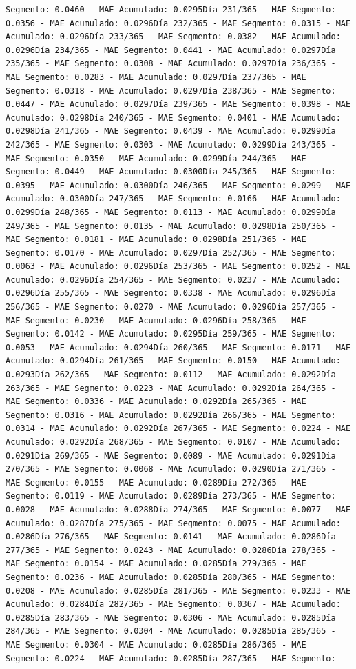 \documentclass[
]{book}
\begin{document}
\begin{verbatim}
Segmento: 0.0460 - MAE Acumulado: 0.0295Día 231/365 - MAE Segmento: 0.0356 - MAE Acumulado: 0.0296Día 232/365 - MAE Segmento: 0.0315 - MAE Acumulado: 0.0296Día 233/365 - MAE Segmento: 0.0382 - MAE Acumulado: 0.0296Día 234/365 - MAE Segmento: 0.0441 - MAE Acumulado: 0.0297Día 235/365 - MAE Segmento: 0.0308 - MAE Acumulado: 0.0297Día 236/365 - MAE Segmento: 0.0283 - MAE Acumulado: 0.0297Día 237/365 - MAE Segmento: 0.0318 - MAE Acumulado: 0.0297Día 238/365 - MAE Segmento: 0.0447 - MAE Acumulado: 0.0297Día 239/365 - MAE Segmento: 0.0398 - MAE Acumulado: 0.0298Día 240/365 - MAE Segmento: 0.0401 - MAE Acumulado: 0.0298Día 241/365 - MAE Segmento: 0.0439 - MAE Acumulado: 0.0299Día 242/365 - MAE Segmento: 0.0303 - MAE Acumulado: 0.0299Día 243/365 - MAE Segmento: 0.0350 - MAE Acumulado: 0.0299Día 244/365 - MAE Segmento: 0.0449 - MAE Acumulado: 0.0300Día 245/365 - MAE Segmento: 0.0395 - MAE Acumulado: 0.0300Día 246/365 - MAE Segmento: 0.0299 - MAE Acumulado: 0.0300Día 247/365 - MAE Segmento: 0.0166 - MAE Acumulado: 0.0299Día 248/365 - MAE Segmento: 0.0113 - MAE Acumulado: 0.0299Día 249/365 - MAE Segmento: 0.0135 - MAE Acumulado: 0.0298Día 250/365 - MAE Segmento: 0.0181 - MAE Acumulado: 0.0298Día 251/365 - MAE Segmento: 0.0170 - MAE Acumulado: 0.0297Día 252/365 - MAE Segmento: 0.0063 - MAE Acumulado: 0.0296Día 253/365 - MAE Segmento: 0.0252 - MAE Acumulado: 0.0296Día 254/365 - MAE Segmento: 0.0237 - MAE Acumulado: 0.0296Día 255/365 - MAE Segmento: 0.0338 - MAE Acumulado: 0.0296Día 256/365 - MAE Segmento: 0.0270 - MAE Acumulado: 0.0296Día 257/365 - MAE Segmento: 0.0230 - MAE Acumulado: 0.0296Día 258/365 - MAE Segmento: 0.0142 - MAE Acumulado: 0.0295Día 259/365 - MAE Segmento: 0.0053 - MAE Acumulado: 0.0294Día 260/365 - MAE Segmento: 0.0171 - MAE Acumulado: 0.0294Día 261/365 - MAE Segmento: 0.0150 - MAE Acumulado: 0.0293Día 262/365 - MAE Segmento: 0.0112 - MAE Acumulado: 0.0292Día 263/365 - MAE Segmento: 0.0223 - MAE Acumulado: 0.0292Día 264/365 - MAE Segmento: 0.0336 - MAE Acumulado: 0.0292Día 265/365 - MAE Segmento: 0.0316 - MAE Acumulado: 0.0292Día 266/365 - MAE Segmento: 0.0314 - MAE Acumulado: 0.0292Día 267/365 - MAE Segmento: 0.0224 - MAE Acumulado: 0.0292Día 268/365 - MAE Segmento: 0.0107 - MAE Acumulado: 0.0291Día 269/365 - MAE Segmento: 0.0089 - MAE Acumulado: 0.0291Día 270/365 - MAE Segmento: 0.0068 - MAE Acumulado: 0.0290Día 271/365 - MAE Segmento: 0.0155 - MAE Acumulado: 0.0289Día 272/365 - MAE Segmento: 0.0119 - MAE Acumulado: 0.0289Día 273/365 - MAE Segmento: 0.0028 - MAE Acumulado: 0.0288Día 274/365 - MAE Segmento: 0.0077 - MAE Acumulado: 0.0287Día 275/365 - MAE Segmento: 0.0075 - MAE Acumulado: 0.0286Día 276/365 - MAE Segmento: 0.0141 - MAE Acumulado: 0.0286Día 277/365 - MAE Segmento: 0.0243 - MAE Acumulado: 0.0286Día 278/365 - MAE Segmento: 0.0154 - MAE Acumulado: 0.0285Día 279/365 - MAE Segmento: 0.0236 - MAE Acumulado: 0.0285Día 280/365 - MAE Segmento: 0.0208 - MAE Acumulado: 0.0285Día 281/365 - MAE Segmento: 0.0233 - MAE Acumulado: 0.0284Día 282/365 - MAE Segmento: 0.0367 - MAE Acumulado: 0.0285Día 283/365 - MAE Segmento: 0.0306 - MAE Acumulado: 0.0285Día 284/365 - MAE Segmento: 0.0304 - MAE Acumulado: 0.0285Día 285/365 - MAE Segmento: 0.0304 - MAE Acumulado: 0.0285Día 286/365 - MAE Segmento: 0.0224 - MAE Acumulado: 0.0285Día 287/365 - MAE Segmento: 
\end{verbatim}
\end{document}
